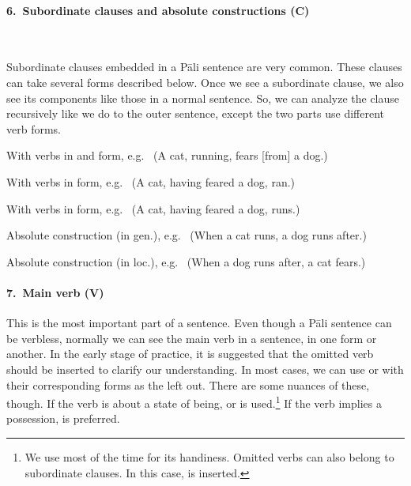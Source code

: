 \paragraph*{6.\ Subordinate clauses and absolute constructions (\textbf{C})} \ \par Subordinate clauses embedded in a P\=ali sentence are very common. These clauses can take several forms described below. Once we see a subordinate clause, we also see its components like those in a normal sentence. So, we can analyze the clause recursively like we do to the outer sentence, except the two parts use different verb forms. 
\begin{compactenum}[(1)]
\item With verbs in  and  form, e.g.\  (A cat, running, fears [from] a dog.)\par
\item With verbs in  form, e.g.\  (A cat, having feared a dog, ran.)\par
\item With verbs in  form, e.g.\  (A cat, having feared a dog, runs.)\par
\item Absolute construction (in gen.), e.g.\  (When a cat runs, a dog runs after.)\par
\item Absolute construction (in loc.), e.g.\  (When a dog runs after, a cat fears.)\par
\end{compactenum}

\paragraph*{7.\ Main verb (\textbf{V})} This is the most important part of a sentence. Even though a P\=ali sentence can be verbless, normally we can see the main verb in a sentence, in one form or another. In the early stage of practice, it is suggested that the omitted verb should be inserted to clarify our understanding. In most cases, we can use  or  with their corresponding forms as the left out. There are some nuances of these, though. If the verb is about a state of being,  or  is used.\footnote{We use  most of the time for its handiness. Omitted verbs can also belong to subordinate clauses. In this case,  is inserted.} If the verb implies a possession,  is preferred. 

